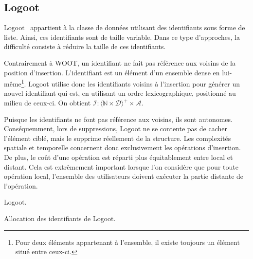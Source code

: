 
\subsection{Logoot}

Logoot~\cite{weiss2009logoot} appartient à la classe de données utilisant des
identifiants sous forme de liste. Ainsi, ces identifiants sont de taille
variable. Dans ce type d'approches, la difficulté consiste à réduire la taille
de ces identifiants.

Contrairement à WOOT, un identifiant ne fait pas référence aux voisins de la
position d'insertion. L'identifiant est un élément d'un ensemble dense en
lui-même\footnote{Pour deux éléments appartenant à l'ensemble, il existe
  toujours un élément situé entre ceux-ci.}. Logoot utilise donc les
identifiants voisins à l'insertion pour générer un nouvel identifiant qui est,
en utilisant un ordre lexicographique, positionné au milieu de ceux-ci. On
obtient
$\mathcal{I}: \langle \mathbb{N} \times \mathcal{D}\rangle^{+} \times
\mathcal{A}$.

Puisque les identifiants ne font pas référence aux voisins, ils sont
autonomes. Conséquemment, lors de suppressions, Logoot ne se contente pas de
cacher l'élément ciblé, mais le supprime réellement de la structure. Les
complexités spatiale et temporelle concernent donc exclusivement les opérations
d'insertion. De plus, le coût d'une opération est réparti plus équitablement
entre local et distant. Cela est extrêmement important lorsque l'on considère
que pour toute opération local, l'ensemble des utilisateurs doivent exécuter la
partie distante de l'opération.

\begin{algorithm}
  
  \caption{\label{algo:logoot}Logoot.}
\end{algorithm}

\begin{algorithm}
  
  \caption{\label{algo:logootalloc}Allocation des identifiants de Logoot.}
\end{algorithm}


